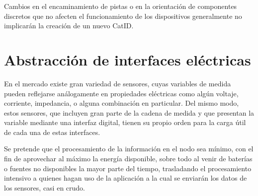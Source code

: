 Cambios en el encaminamiento de pistas o en la orientación de componentes discretos que no afecten el funcionamiento de los dispositivos generalmente no implicarán la creación de un nuevo CatID.

\section{Abstracción de interfaces eléctricas}

En el mercado existe gran variedad de sensores, cuyas variables de medida pueden reflejarse análogamente en propiedades eléctricas como algún voltaje, corriente, impedancia, o alguna combinación en particular. Del mismo modo, estos sensores, que incluyen gran parte de la cadena de medida y que presentan la variable mediante una interfaz digital, tienen su propio orden para la carga útil de cada una de estas interfaces.

Se pretende que el procesamiento de la información en el nodo sea mínimo, con el fin de aprovechar al máximo la energía disponible, sobre todo al venir de baterías o fuentes no disponibles la mayor parte del tiempo, trasladando el procesamiento intensivo a quienes hagan uso de la aplicación a la cual se enviarán los datos de los sensores, casi en crudo.
